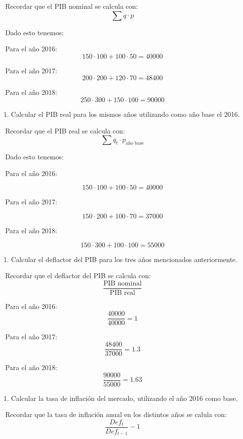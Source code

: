 \documentclass[
  letterpaper,
  DIV=11,
  numbers=noendperiod]{scrreport}
\providecommand{\tightlist}{%
  \setlength{\itemsep}{0pt}\setlength{\parskip}{0pt}}\usepackage{longtable,booktabs,array}
\begin{document}
~ Recordar que el PIB nominal se calcula con: \[
\sum q\cdot p
\]

~ Dado esto tenemos:

~ Para el año 2016: \[
150\cdot 100 + 100 \cdot 50 = 40000
\]

~ Para el año 2017: \[
200\cdot 200 + 120 \cdot 70 = 48400 
\]

~ Para el año 2018: \[
250\cdot 300 + 150 \cdot 100 = 90000 
\]

\begin{enumerate}
\def\labelenumi{\arabic{enumi})}
\setcounter{enumi}{1}
\tightlist
\item
  Calcular el PIB real para los mismos años utilizando como año base el
  2016.
\end{enumerate}

~ Recordar que el PIB real se calcula con: \[
\sum q_t\cdot p_{\text{año base}}
\]

~ Dado esto tenemos:

~ Para el año 2016:

\[
150\cdot 100 + 100 \cdot 50 = 40000
\]

~ Para el año 2017:

\[
150\cdot 200 + 100 \cdot 70 = 37000
\]

~ Para el año 2018:

\[
150\cdot 300 + 100 \cdot 100 = 55000
\]

\begin{enumerate}
\def\labelenumi{\arabic{enumi})}
\setcounter{enumi}{2}
\tightlist
\item
  Calcular el deflactor del PIB para los tres años mencionados
  anteriormente.
\end{enumerate}

~ Recordar que el deflactor del PIB se calcula con: \[
\frac{\text{PIB nominal}}{\text{PIB real}}
\]

~ Para el año 2016: \[
\frac{40000}{40000}=1
\]

~ Para el año 2017: \[
\frac{48400}{37000}=1.3
\]

~ Para el año 2018: \[
\frac{90000}{55000}=1.63
\]

\begin{enumerate}
\def\labelenumi{\arabic{enumi})}
\setcounter{enumi}{3}
\tightlist
\item
  Calcular la tasa de inflación del mercado, utilizando el año 2016 como
  base.
\end{enumerate}

~ Recordar que la tasa de inflación anual en los distintos años se
calula con: \[
\frac{Def_{t}}{Def_{t-1}}-1
\]
\end{document}
